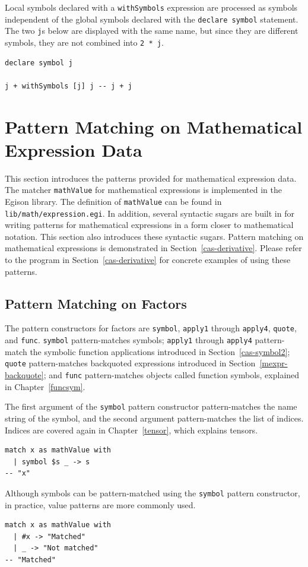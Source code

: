 Local symbols declared with a \lstinline{withSymbols} expression are processed as symbols independent of the global symbols declared with the \lstinline{declare symbol} statement.
The two \lstinline{j}s below are displayed with the same name, but since they are different symbols, they are not combined into \lstinline{2 * j}.
\begin{lstlisting}[language=egison,numbers=none]
declare symbol j

j + withSymbols [j] j -- j + j
\end{lstlisting}

\section{Pattern Matching on Mathematical Expression Data}\label{mexpr-pattern}

This section introduces the patterns provided for mathematical expression data.
The matcher \lstinline{mathValue} for mathematical expressions is implemented in the Egison library.
The definition of \lstinline{mathValue} can be found in \texttt{lib/math/expression.egi}.
In addition, several syntactic sugars are built in for writing patterns for mathematical expressions in a form closer to mathematical notation.
This section also introduces these syntactic sugars.
Pattern matching on mathematical expressions is demonstrated in Section~\ref{cas-derivative}.
Please refer to the program in Section~\ref{cas-derivative} for concrete examples of using these patterns.

\subsection{Pattern Matching on Factors}

The pattern constructors for factors are \lstinline{symbol}, \lstinline{apply1} through \lstinline{apply4}, \lstinline{quote}, and \lstinline{func}.
\lstinline{symbol} pattern-matches symbols; \lstinline{apply1} through \lstinline{apply4} pattern-match the symbolic function applications introduced in Section~\ref{cas-symbol2}; \lstinline{quote} pattern-matches backquoted expressions introduced in Section~\ref{mexpr-backquote}; and \lstinline{func} pattern-matches objects called function symbols, explained in Chapter~\ref{funcsym}.

The first argument of the \lstinline{symbol} pattern constructor pattern-matches the name string of the symbol, and the second argument pattern-matches the list of indices.
Indices are covered again in Chapter~\ref{tensor}, which explains tensors.
\begin{lstlisting}[language=egison,numbers=none]
match x as mathValue with
  | symbol $s _ -> s
-- "x"
\end{lstlisting}
Although symbols can be pattern-matched using the \lstinline{symbol} pattern constructor, in practice, value patterns are more commonly used.
\begin{lstlisting}[language=egison,numbers=none]
match x as mathValue with
  | #x -> "Matched"
  | _ -> "Not matched"
-- "Matched"
\end{lstlisting}

